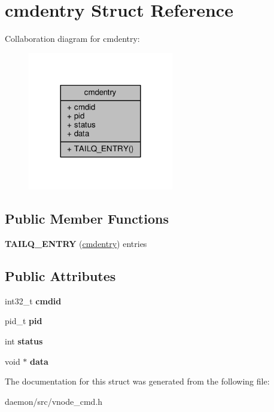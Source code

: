 \hypertarget{structcmdentry}{\section{cmdentry Struct Reference}
\label{structcmdentry}
}


Collaboration diagram for cmdentry\+:
\nopagebreak
\begin{figure}[H]
\begin{center}
\leavevmode
\includegraphics[width=180pt]{structcmdentry__coll__graph}
\end{center}
\end{figure}
\subsection*{Public Member Functions}
\begin{DoxyCompactItemize}
\item 
\hypertarget{structcmdentry_a7af1235a61fd7eb240cf4837647d7370}{{\bfseries T\+A\+I\+L\+Q\+\_\+\+E\+N\+T\+R\+Y} (\hyperlink{structcmdentry}{cmdentry}) entries}\label{structcmdentry_a7af1235a61fd7eb240cf4837647d7370}

\end{DoxyCompactItemize}
\subsection*{Public Attributes}
\begin{DoxyCompactItemize}
\item 
\hypertarget{structcmdentry_ab6863dee412451bf345b01ffa54c51d8}{int32\+\_\+t {\bfseries cmdid}}\label{structcmdentry_ab6863dee412451bf345b01ffa54c51d8}

\item 
\hypertarget{structcmdentry_ab1c6f5d20e481a22d8fe70906901dcd4}{pid\+\_\+t {\bfseries pid}}\label{structcmdentry_ab1c6f5d20e481a22d8fe70906901dcd4}

\item 
\hypertarget{structcmdentry_abe389e74cb293db8a0ed568594566ec8}{int {\bfseries status}}\label{structcmdentry_abe389e74cb293db8a0ed568594566ec8}

\item 
\hypertarget{structcmdentry_ae66a079b2459c358c0a2a067c2582750}{void $\ast$ {\bfseries data}}\label{structcmdentry_ae66a079b2459c358c0a2a067c2582750}

\end{DoxyCompactItemize}


The documentation for this struct was generated from the following file\+:\begin{DoxyCompactItemize}
\item 
daemon/src/vnode\+\_\+cmd.\+h\end{DoxyCompactItemize}
